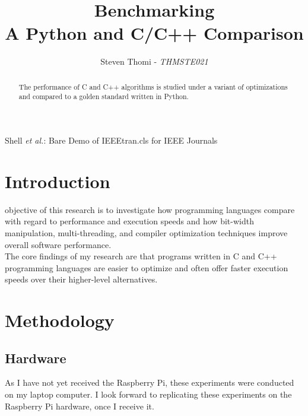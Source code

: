 \documentclass[journal]{IEEEtran}
\begin{document}
\title{Benchmarking\\ A Python and C/C++ Comparison}


\author{Steven Thomi - \textit{THMSTE021}\\
}

%
{Shell \MakeLowercase{\textit{et al.}}: Bare Demo of IEEEtran.cls for IEEE Journals}%

\maketitle

\begin{abstract}
The performance of C and C++ algorithms is studied under a variant of optimizations and compared to a golden standard written in Python.
\end{abstract}

\IEEEpeerreviewmaketitle


\section{Introduction}

objective of this research is to investigate how programming languages compare with regard to performance and execution speeds and how bit-width manipulation, multi-threading, and compiler optimization techniques improve overall software performance.\\
The core findings of my research are that programs written in C and C++ programming languages are easier to optimize and often offer faster execution speeds over their higher-level alternatives.

\section{Methodology}

\subsection{Hardware}
As I have not yet received the Raspberry Pi, these experiments were conducted on my laptop computer. I look forward to replicating these experiments on the Raspberry Pi hardware, once I receive it.
\end{document}
